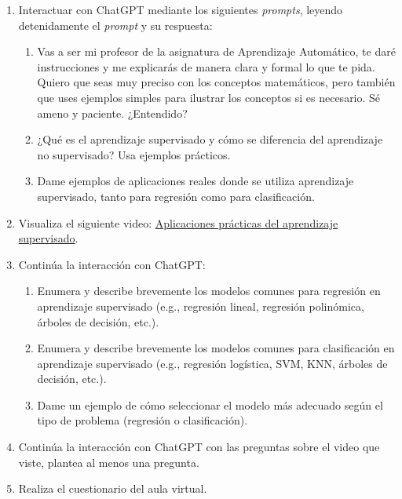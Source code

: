 \documentclass[a4,11pt]{aleph-notas}
\begin{document}
\begin{enumerate}[leftmargin=*]
    \item Interactuar con ChatGPT mediante los siguientes \textit{prompts}, leyendo detenidamente el \textit{prompt} y su respuesta:
    \begin{enumerate}[label=\textit{Prompt \arabic*.},leftmargin=2.1cm]
        \item Vas a ser mi profesor de la asignatura de Aprendizaje Automático, te daré instrucciones y me explicarás de manera clara y formal lo que te pida. Quiero que seas muy preciso con los conceptos matemáticos, pero también que uses ejemplos simples para ilustrar los conceptos si es necesario. Sé ameno y paciente. ¿Entendido?
        \item ¿Qué es el aprendizaje supervisado y cómo se diferencia del aprendizaje no supervisado? Usa ejemplos prácticos.
        \item Dame ejemplos de aplicaciones reales donde se utiliza aprendizaje supervisado, tanto para regresión como para clasificación.
    \end{enumerate}
    \item Visualiza el siguiente video: \href{https://youtu.be/ijJYeLFtiVM?si=_ye7QDqMGJc9lvB8}{Aplicaciones prácticas del aprendizaje supervisado}.
    \item Continúa la interacción con ChatGPT:
    \begin{enumerate}[label=\textit{Prompt \arabic*.},leftmargin=2.1cm, start=4]
        \item Enumera y describe brevemente los modelos comunes para regresión en aprendizaje supervisado (e.g., regresión lineal, regresión polinómica, árboles de decisión, etc.).
        \item Enumera y describe brevemente los modelos comunes para clasificación en aprendizaje supervisado (e.g., regresión logística, SVM, KNN, árboles de decisión, etc.).
        \item Dame un ejemplo de cómo seleccionar el modelo más adecuado según el tipo de problema (regresión o clasificación).
    \end{enumerate}
    \item Continúa la interacción con ChatGPT con las preguntas sobre el video que viste, plantea al menos una pregunta.
    \item Realiza el cuestionario del aula virtual.
\end{enumerate}
\end{document}
